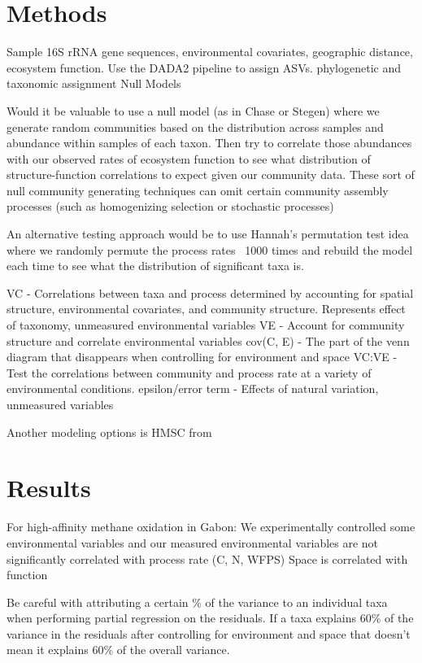 \documentclass{article}
\begin{document}
\section{Methods}

Sample 16S rRNA gene sequences, environmental covariates, geographic distance,
ecosystem function. Use the DADA2 pipeline to assign ASVs. 
phylogenetic and taxonomic assignment Null
Models \citep{chase2011, stegen2015}

Would it be valuable to use a null model (as in Chase or Stegen) where we
generate random communities based on the distribution across samples and
abundance within samples of each taxon. Then try to correlate those abundances
with our observed rates of ecosystem function to see what distribution of
structure-function correlations to expect given our community data. These sort
of null community generating techniques can omit certain community assembly
processes (such as homogenizing selection or stochastic processes)

An alternative testing approach would be to use Hannah’s permutation test idea
where we randomly permute the process rates ~1000 times and rebuild the model
each time to see what the distribution of significant taxa is.

VC - Correlations between taxa and process determined by accounting for spatial
structure, environmental covariates, and community structure. Represents effect
of taxonomy, unmeasured environmental variables VE - Account for community
structure and correlate environmental variables cov(C, E) - The part of the venn
diagram that disappears when controlling for environment and space VC:VE - Test
the correlations between community and process rate at a variety of
environmental conditions.  epsilon/error term - Effects of natural variation,
unmeasured variables

Another modeling options is HMSC from \cite{ovaskainen2017} 

\section{Results}

For high-affinity methane oxidation in Gabon: We experimentally controlled some
environmental variables and our measured environmental variables are not
significantly correlated with process rate (C, N, WFPS) Space is correlated with
function



Be careful with attributing a certain \% of the variance to an individual taxa
when performing partial regression on the residuals. If a taxa explains 60\% of
the variance in the residuals after controlling for environment and space that
doesn’t mean it explains 60\% of the overall variance.
\end{document}
